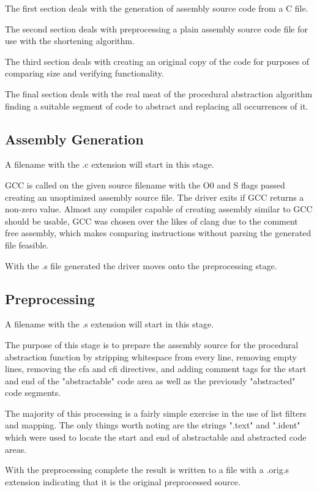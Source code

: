 \documentclass[9pt,nocopyrightspace]{sigplanconf}
\begin{document}
The first section deals with the generation of assembly source code from a C file.

The second section deals with preprocessing a plain assembly source code file for use with the shortening algorithm.

The third section deals with creating an original copy of the code for purposes of comparing size and verifying functionality.

The final section deals with the real meat of the procedural abstraction algorithm finding a suitable segment of code to abstract  and replacing all occurrences of it.

\subsection{Assembly Generation}

A filename with the .c extension will start in this stage.

GCC is called on the given source filename with the O0 and S flags passed creating an unoptimized assembly source file.
The driver exits if GCC returns a non-zero value.
Almost any compiler capable of creating assembly similar to GCC should be usable, GCC was chosen over the likes of clang due to the comment free assembly, which makes comparing instructions without parsing the generated file feasible.

With the .s file generated the driver moves onto the preprocessing stage.

\subsection{Preprocessing}

A filename with the .s extension will start in this stage.

The purpose of this stage is to prepare the assembly source for the procedural abstraction function by stripping whitespace from every line, removing empty lines, removing the cfa and cfi directives, and adding comment tags for the start and end of the "abstractable" code area as well as the previously "abstracted" code segments.

The majority of this processing is a fairly simple exercise in the use of list filters and mapping.
The only things worth noting are the strings ".text" and ".ident" which were used to locate the start and end of abstractable and abstracted code areas.

With the preprocessing complete the result is written to a file with a .orig.s extension indicating that it is the original preprocessed source.
\end{document}
